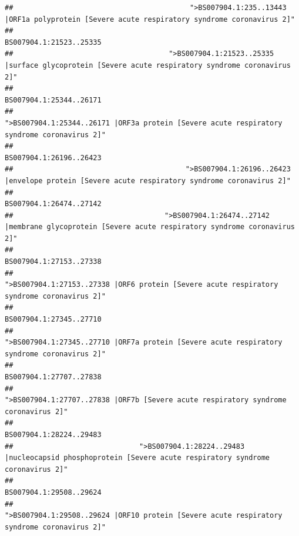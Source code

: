 \documentclass[
]{article}
\begin{document}
\begin{verbatim}
##                                          ">BS007904.1:235..13443 |ORF1a polyprotein [Severe acute respiratory syndrome coronavirus 2]" 
##                                                                                                                BS007904.1:21523..25335 
##                                     ">BS007904.1:21523..25335 |surface glycoprotein [Severe acute respiratory syndrome coronavirus 2]" 
##                                                                                                                BS007904.1:25344..26171 
##                                            ">BS007904.1:25344..26171 |ORF3a protein [Severe acute respiratory syndrome coronavirus 2]" 
##                                                                                                                BS007904.1:26196..26423 
##                                         ">BS007904.1:26196..26423 |envelope protein [Severe acute respiratory syndrome coronavirus 2]" 
##                                                                                                                BS007904.1:26474..27142 
##                                    ">BS007904.1:26474..27142 |membrane glycoprotein [Severe acute respiratory syndrome coronavirus 2]" 
##                                                                                                                BS007904.1:27153..27338 
##                                             ">BS007904.1:27153..27338 |ORF6 protein [Severe acute respiratory syndrome coronavirus 2]" 
##                                                                                                                BS007904.1:27345..27710 
##                                            ">BS007904.1:27345..27710 |ORF7a protein [Severe acute respiratory syndrome coronavirus 2]" 
##                                                                                                                BS007904.1:27707..27838 
##                                                    ">BS007904.1:27707..27838 |ORF7b [Severe acute respiratory syndrome coronavirus 2]" 
##                                                                                                                BS007904.1:28224..29483 
##                              ">BS007904.1:28224..29483 |nucleocapsid phosphoprotein [Severe acute respiratory syndrome coronavirus 2]" 
##                                                                                                                BS007904.1:29508..29624 
##                                            ">BS007904.1:29508..29624 |ORF10 protein [Severe acute respiratory syndrome coronavirus 2]" 

\end{verbatim}
\end{document}
